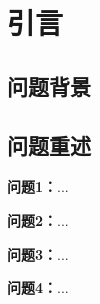 
\section{引言}
\subsection{问题背景}



\subsection{问题重述}

\textbf{问题1：}...

\textbf{问题2：}...

\textbf{问题3：}...

\textbf{问题4：}...
